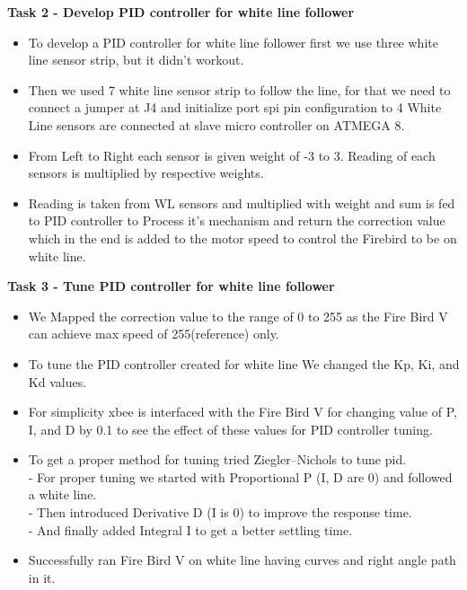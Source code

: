 \documentclass[report]{res}
\begin{document}
	
	{\Large \textbf{Task 2 - Develop PID controller for white line follower}\par}
	\begin{itemize}
		
		\item To develop a PID controller for white line follower first we use three white line sensor strip, but it didn't workout. \\
		\item Then we used 7 white line sensor strip to follow the line, for that we need to connect a jumper at J4 and initialize port spi pin configuration to 4 White Line sensors are connected at slave micro controller on ATMEGA 8. \\
		\item From Left to Right each sensor is given weight of -3 to 3. Reading of each sensors is multiplied by respective weights. \\
		\item Reading is taken from WL sensors and multiplied with weight and sum is fed to PID controller to Process it's mechanism and return the correction value which in the end is added to the motor speed to control the Firebird to be on white line.\\
		
	\end{itemize}
	
	
	{\Large \textbf{Task 3 - Tune PID controller for white line follower}\par}
	\begin{itemize}
		
		\item We Mapped the correction value to the range of 0 to 255 as the Fire Bird V can achieve max speed of 255(reference) only. \\
		\item To tune the PID controller created for white line We changed the Kp, Ki, and Kd values. \\
		\item For simplicity xbee is interfaced with the Fire Bird V for changing value of P, I, and D by 0.1 to see the effect of these values for PID controller tuning. \\
		\item To get a proper method for tuning tried Ziegler–Nichols to tune pid.\\
		- For proper tuning we started with Proportional P (I, D are 0) and followed a white line.\\
		- Then introduced Derivative D (I is 0) to improve the response time.\\
		- And finally added Integral I to get a better settling time.\\
		\item Successfully ran Fire Bird V on white line having curves and right angle path in it.\\ \\
		
	\end{itemize}
	
\end{document}
